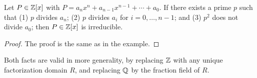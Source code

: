 \begin{prop}
Let $P \in \mathbb{Z}[x]$ with $P = a_n x^n + a_{n-1} x^{n-1} + \dotsb + a_0$. If there exists a prime $p$ such that (1) $p$ divides $a_n$; (2) $p$ divides $a_i$ for $i = 0, \dotsc, n-1$; and (3) $p^2$ does not divide $a_0$; then $P \in \mathbb{Z}[x]$ is irreducible.
\end{prop}
\begin{proof}
The proof is the same as in the example.
\end{proof}

Both facts are valid in more generality, by replacing $\mathbb{Z}$ with any unique factorization domain $R$, and replacing $\mathbb{Q}$ by the fraction field of $R$.
